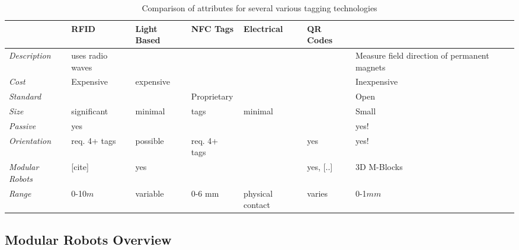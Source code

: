 \begin{table*}[t]
	\centering
	\caption{Comparison of attributes for several various tagging technologies}
	\newcommand{\wdd}{2.15cm}
	\begin{tabular}{ p{1.7 cm} p{\wdd}  p{\wdd} p{\wdd} p{\wdd} p{\wdd} p{\wdd} p{\wdd}  }
		\hline
		\addlinespace[1ex]
											& RFID 				& Light Based	& NFC Tags 		& Electrical 		& QR Codes 		& \bf{\tagNamePlural} \\ %
		\hline

		\textit{Description}				& uses radio waves	& 				& 				& 					& 	  			& Measure field direction of permanent magnets \\

\addlinespace[1ex]	 \textit{Cost}			& Expensive			& expensive		& 				& 					& 	 			& Inexpensive \\
		
\addlinespace[1ex] 	\textit{Standard}		& 					&  				& Proprietary	& 					& 				& Open \\
		
\addlinespace[1ex] 	\textit{Size} 			& significant 		& minimal 		& tags  		& minimal	  		&       		& Small		  \\
		
\addlinespace[1ex]	\textit{Passive} 		& yes				& 				&  				&	 				&				& yes!		  \\
		
\addlinespace[1ex] 	\textit{Orientation} 	& req. 4+ tags 		& possible 		& req. 4+ tags 	&	 				& yes			& yes!		\\
		
\addlinespace[1ex] 	\textit{Modular Robots}	& [cite]			& yes			&	  			&					& yes, [..]		& 3D M-Blocks\\
		
\addlinespace[1ex] 	\textit{Range}			& 0-10$m$			& variable		& 0-6 mm		& physical contact	& varies		& 0-1$mm$	\\
	\end{tabular}
	\label{tab:tagTech}
\end{table*}

\subsection{Modular Robots Overview}
\label{sec:RWconfiguration}

